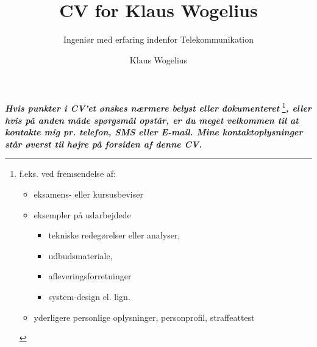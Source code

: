 \documentclass[10pt,twoside,a4paper]{curve} %
\title{CV for Klaus Wogelius}
\subtitle{Ingeniør med erfaring indenfor Telekommunikation}
\author{Klaus Wogelius}
\begin{document}
\makeheaders 
\maketitle
{}
\pagebreak
{}
\vfill %
\textbf{\textit{Hvis punkter i CV'et ønskes nærmere belyst eller dokumenteret}}
\footnote{
f.eks. ved fremsendelse af:
\begin{itemize}
\item eksamens- eller kursusbeviser
\item eksempler på udarbejdede 
\begin{itemize}
\item tekniske redegørelser eller analyser,
\item udbudsmateriale,
\item afleveringsforretninger
\item system-design el. lign.
\end{itemize}
\item yderligere personlige oplysninger, personprofil, straffeattest
\end{itemize}
}\textbf{\textit{, eller hvis på anden måde spørgsmål opstår, er du meget velkommen til at kontakte mig pr. telefon, SMS eller E-mail. Mine kontaktoplysninger står øverst til højre på forsiden af denne CV.}}
\vspace{10mm}
%
%
\end{document}

